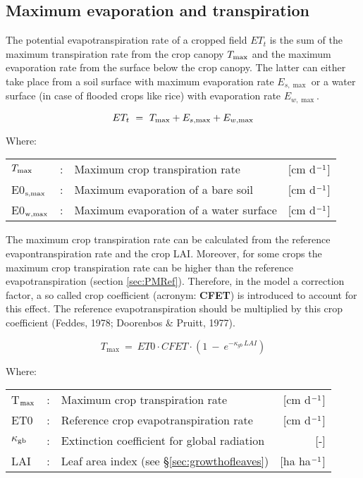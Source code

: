 \subsection{Maximum evaporation and transpiration}
The potential evapotranspiration rate of a cropped field $ET_{t}$ is the sum of the maximum transpiration rate from the crop canopy $T_{{\rm \max}}$ and the maximum evaporation rate from the surface below the crop canopy. The latter can either take place from a soil surface with maximum evaporation rate $E_{s,\max}$ or a water surface (in case of flooded crops like rice) with evaporation rate $E_{w,\max}$.

\begin{equation}
\label{eq:6.2}
ET_{t} ~=~ T_{{\rm \max}} + E_{s,\max} + E_{w,\max}
\end{equation}

Where:\\[5pt]
\begin{tabularx}{\textwidth}{llXr}
    $T_{{\rm \max}}$ &:& Maximum crop transpiration rate  & [cm d$^{{\rm -1}}$]\\
	E0$_{{\rm s,\max}}$ &:& Maximum evaporation of a bare soil  & [cm d$^{{\rm -1}}$]\\
	E0$_{{\rm w,\max}}$ &:& Maximum evaporation of a water surface & [cm d$^{{\rm -1}}$]\\
\end{tabularx}

The maximum crop transpiration rate can be calculated from the reference evapontranspiration
rate and the crop LAI. Moreover, for some crops the maximum crop transpiration rate can be higher 
than the reference evapotranspiration (section \ref{sec:PMRef}). Therefore, in the model a 
correction factor, a so called  crop coefficient (acronym: {\bf CFET}) is introduced to account 
for this effect. The reference evapotranspiration should be multiplied by this crop coefficient 
(Feddes, 1978; Doorenbos \& Pruitt, 1977).

\begin{equation}
\label{eq:6.4}
T_{\max} ~=~ ET0 \cdot CFET \cdot (1~-~e ^{-\kappa _{gb} \, LAI} )
\end{equation}

Where:\\[5pt]
\begin{tabularx}{\textwidth}{llXr}
	T$_{{\rm \max}}$ &:& Maximum crop transpiration rate & [cm d$^{{\rm -1}}$]\\
	ET0 &:& Reference crop evapotranspiration rate & [cm d$^{{\rm -1}}$]\\
	$\kappa$$_{{\rm gb}}$ &:& Extinction coefficient for global radiation & [-]\\
	LAI &:& Leaf area index (see \S \ref{sec:growthofleaves}) & [ha ha$^{{\rm -1}}$]\\
\end{tabularx}

